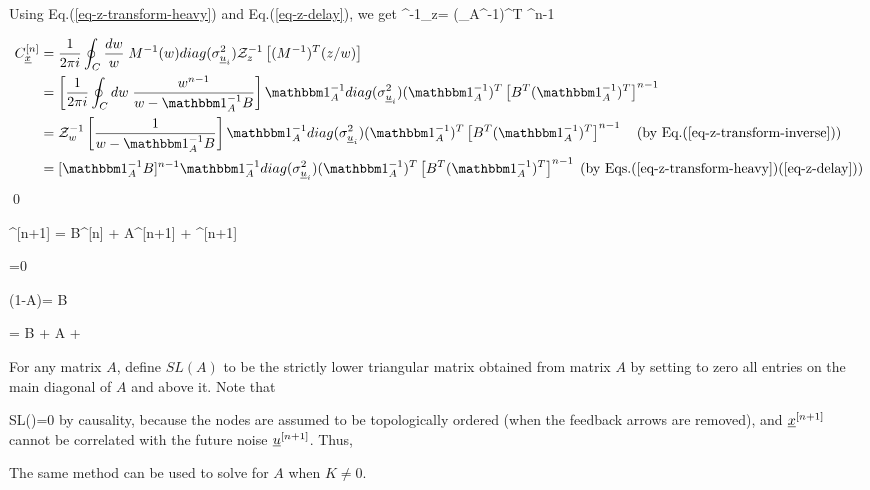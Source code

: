 Using Eq.(\ref{eq-z-transform-heavy})
and Eq.(\ref{eq-z-delay}), we get
\beq
\calz^{-1}_z
=
 (\indi_A^{-1})^T
^{n-1}
\eeq

\begin{align}
C_\rvx^{[n]}
&=
\frac{1}{2\pi i}
\oint_C \frac{dw}{w}\;
M^{-1}(w)
diag(\s^2_{\rvu_i})
\calz^{-1}_z\left[
(M^{-1})^T(z/w)\right]
\\
&=
\left[
\frac{1}{2\pi i}
\oint_C dw\;
\frac{w^{n-1}}
{w-\indi_A^{-1}B}
\right]
\indi_A^{-1}
diag(\s^2_{\rvu_i})
 (\indi_A^{-1})^T
\left[B^T(\indi_A^{-1})^T\right]^{n-1}
\\
&=
\calz_{w}^{-1}
\left[
\frac{1}
{w-\indi_A^{-1}B}
\right]
\indi_A^{-1}
diag(\s^2_{\rvu_i})
 (\indi_A^{-1})^T
\left[B^T(\indi_A^{-1})^T\right]^{n-1}
\quad\text{(by Eq.(\ref{eq-z-transform-inverse}))}
\\
&=
[\indi_A^{-1}B]^{n-1}
\indi_A^{-1}
diag(\s^2_{\rvu_i})
 (\indi_A^{-1})^T
\left[B^T(\indi_A^{-1})^T\right]^{n-1}
\;\text{(by Eqs.(\ref{eq-z-transform-heavy})(\ref{eq-z-delay}))}
\end{align}
\qed

\beq
\rvx^{[n+1]} = B\rvx^{[n]} + A\rvx^{[n+1]}
+ \rvu^{[n+1]}
\eeq

\beq
{}=0
\eeq

\beq
(1-A)=
B 
\eeq

\beq
{}
\eeq



\beq
{}
= B
 + A
+ 
\eeq

For any matrix $A$,
define $SL(A)$ 
to be the strictly lower triangular
matrix obtained from matrix $A$ by
setting to zero all entries 
on the main diagonal of $A$ and above it.
Note that

\beq 
SL()=0
\eeq
by causality,
because the nodes are assumed to be topologically ordered (when the feedback
arrows are removed),
and ${\underline{x}}^{[n+1]}$ cannot be correlated
with the future noise ${\underline{u}}^{[n+1]}$.
Thus,

\beq
{}
\label{eq-sl-a-k}
\eeq
 
 
The same method can be used to solve for
$A$ when $K\neq 0$.

